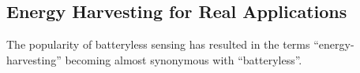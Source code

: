 \subsection{Energy Harvesting for Real Applications}
The popularity of batteryless sensing has resulted in the terms ``energy-harvesting'' becoming almost synonymous with ``batteryless''.
%
%
%
